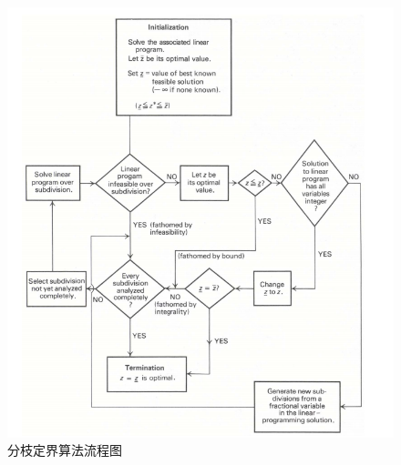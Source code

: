 \begin{figure}[H]
	\centering
	\includegraphics[width=\textwidth,height=\textheight,keepaspectratio]{contents/img/BB.png}
	\caption{分枝定界算法流程图}
\end{figure}

